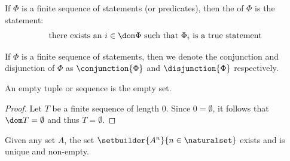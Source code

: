\begin{dfn}
     \label{dfn:metatheory-generalized-disjunction}
    If \( \Phi \) is a finite sequence of statements (or predicates), then the  of \( \Phi \)
    is the statement:
    \begin{equation*}
        \text{there exists an \( i \in \dom \Phi \) such that \( \Phi_{i} \) is a true statement}
    \end{equation*}
\end{dfn}

\begin{notation}
    If \( \Phi \) is a finite sequence of statements, then we denote the conjunction and disjunction of \( \Phi \)
    as \( \conjunction{\Phi} \) and \( \disjunction{\Phi} \) respectively.
\end{notation}

\begin{thm}
     \label{thm:metatheory-empty-set-is-the-zero-tuple-and-empty-sequence}
    An empty tuple or sequence is the empty set.
\end{thm}

\begin{proof}
    Let \( T \) be a finite sequence of length \( 0 \).
    Since \( 0 = \emptyset \), it follows that \( \dom T = \emptyset \) and thus \( T = \emptyset \).
\end{proof}

\begin{thm}
     \label{thm:metatheory-existence-of-set-of-all-n-ary-products}
    Given any set \( A \), the set \( \setbuilder{A^{n}}{n \in \naturalset} \) exists and is unique and non-empty.
\end{thm}

